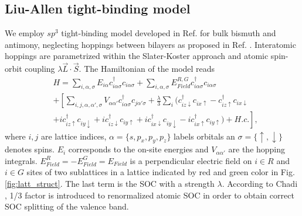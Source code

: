 \subsection{Liu-Allen tight-binding model}
We employ $sp^3$ tight-binding model developed in Ref. \cite{Liu:Allen} for bulk bismuth and antimony, neglecting hoppings between bilayers as proposed in Ref. \cite{Murakami:BiQSH}. Interatomic hoppings are parametrized within the Slater-Koster approach \cite{Slater:Koster} and atomic spin-orbit coupling $\lambda \vec{L}\cdot\vec{S}$. The Hamiltonian of the model reads
\begin{equation}
\begin{aligned}
&H = \sum_{i, \alpha,\sigma}E_{i\alpha}c^\dagger_{i\alpha\sigma}c_{i\alpha\sigma} +\sum_{i,\alpha,\sigma}E_{Field}^{R,G}c^\dagger_{i\alpha\sigma}c_{i\alpha\sigma}  \\
& + \left[ \sum_{i,j,\alpha,\alpha',\sigma}V_{\alpha\alpha'}c^\dagger_{i\alpha\sigma}c_{j\alpha'\sigma} +\frac{\lambda}{3}\sum_{i}(c^\dagger_{iz\downarrow}c_{ix\uparrow} - c^\dagger_{iz\uparrow}c_{ix\downarrow} \right. \\
& \left. +ic^\dagger_{iz\uparrow}c_{iy\downarrow}+ic^\dagger_{iz\downarrow}c_{iy\uparrow} +ic^\dagger_{ix\downarrow}c_{iy\downarrow}-ic^\dagger_{ix\uparrow}c_{iy\uparrow})+ H. c. \right] ,
\end{aligned}
\label{eq:liu allen}
\end{equation}
where $i, j$ are lattice indices, $\alpha = \lbrace s, p_x, p_y, p_z \rbrace$ labels orbitals an $\sigma= \lbrace \uparrow,\downarrow \rbrace$ denotes spins. $E_{i}$ corresponds to the on-site energies and $V_{\alpha\alpha'}$ are the hopping integrals. $E_{Field}^{R} =-E_{Field}^{G} =E_{Field}$ is a perpendicular electric field on $i\in R$ and $i\in G$ sites of two sublattices in a lattice indicated by red and green color in Fig. \ref{fig:latt_struct}. The last term is the SOC with a strength $\lambda$. According to Chadi \cite{Chadi}, 1/3 factor is introduced to renormalized atomic SOC in order to obtain correct SOC splitting of the valence band. 

